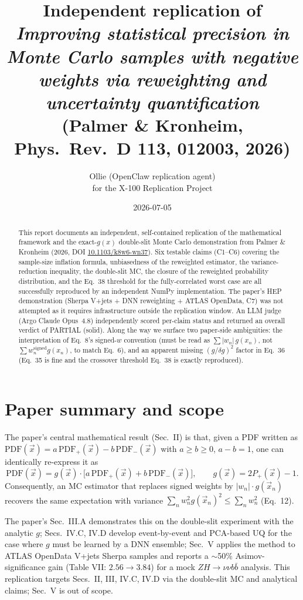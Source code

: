 \documentclass[11pt,letterpaper]{article}
\title{Independent replication of \\
       \emph{Improving statistical precision in Monte Carlo samples with negative
       weights via reweighting and uncertainty quantification} \\
       (Palmer \& Kronheim, Phys.\ Rev.\ D \textbf{113}, 012003, 2026)}
\author{Ollie (OpenClaw replication agent) \\
        for the X-100 Replication Project}
\date{2026-07-05}
\begin{document}
\maketitle

\begin{abstract}
This report documents an independent, self-contained replication of the mathematical
framework and the exact-$g(x)$ double-slit Monte Carlo demonstration from Palmer \& Kronheim
(2026, DOI \href{https://doi.org/10.1103/k8w6-wn37}{10.1103/k8w6-wn37}). Six testable
claims (C1--C6) covering the sample-size inflation formula, unbiasedness of the reweighted
estimator, the variance-reduction inequality, the double-slit MC, the closure of the
reweighted probability distribution, and the Eq.~38 threshold for the fully-correlated worst
case are all successfully reproduced by an independent NumPy implementation. The paper's HEP
demonstration (Sherpa V+jets + DNN reweighting + ATLAS OpenData, C7) was not attempted as it
requires infrastructure outside the replication window. An LLM judge (Argo Claude Opus~4.8)
independently scored per-claim status and returned an overall verdict of PARTIAL (solid).
Along the way we surface two paper-side ambiguities: the interpretation of Eq.~8's signed-$w$
convention (must be read as $\sum |w_n| \, g(x_n)$, not $\sum w_n^\text{signed} g(x_n)$, to
match Eq.~6), and an apparent missing $(g/\delta g)^2$ factor in Eq.~36 (Eq.~35 is fine and
the crossover threshold Eq.~38 is exactly reproduced).
\end{abstract}

\section{Paper summary and scope}

The paper's central mathematical result (Sec.~II) is that, given a PDF written as
$\mathrm{PDF}(\vec{x}) = a\,\mathrm{PDF}_+(\vec{x}) - b\,\mathrm{PDF}_-(\vec{x})$
with $a \ge b \ge 0$, $a - b = 1$, one can identically re-express it as
\begin{equation}
  \mathrm{PDF}(\vec{x}) = g(\vec{x}) \cdot \bigl[a\,\mathrm{PDF}_+(\vec{x}) + b\,\mathrm{PDF}_-(\vec{x})\bigr],
  \qquad g(\vec{x}) = 2 P_+(\vec{x}) - 1.
\end{equation}
Consequently, an MC estimator that replaces signed weights by $|w_n| \cdot g(\vec{x}_n)$
recovers the same expectation with variance
$\sum_n w_n^2 g(\vec{x}_n)^2 \le \sum_n w_n^2$ (Eq.~12).

\noindent The paper's Sec.~III.A demonstrates this on the double-slit experiment with the
analytic $g$; Secs.~IV.C, IV.D develop event-by-event and PCA-based UQ for the case where
$g$ must be learned by a DNN ensemble; Sec.~V applies the method to ATLAS OpenData V+jets
Sherpa samples and reports a $\sim$50\% Asimov-significance gain (Table VII: $2.56 \to 3.84$)
for a mock $ZH \to \nu\nu b\bar b$ analysis. This replication targets Secs.~II, III, IV.C,
IV.D via the double-slit MC and analytical claims; Sec.~V is out of scope.
\end{document}
